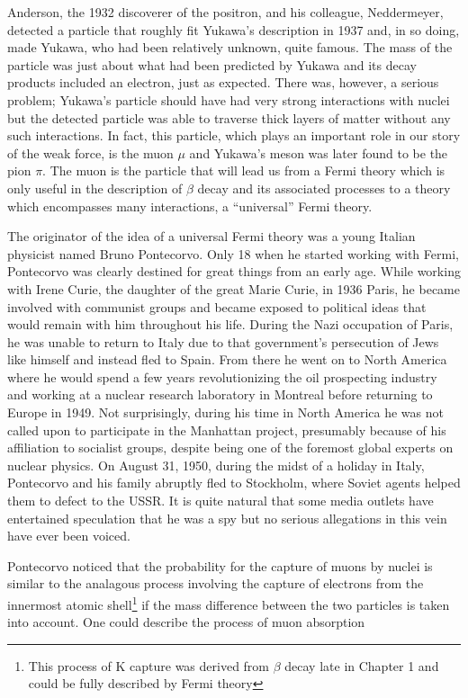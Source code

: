 \documentclass[a4paper,12pt]{book}
\begin{document}
Anderson, the 1932 discoverer of the positron, and his colleague, Neddermeyer, detected a particle that roughly fit Yukawa's description in 1937 \cite{anderson:muon} and, in so doing, made Yukawa, who had been relatively unknown, quite famous. The mass of the particle was just about what had been predicted by Yukawa and its decay products included an electron, just as expected. There was, however, a serious problem; Yukawa's particle should have had very strong interactions with nuclei but the detected particle was able to traverse thick layers of matter without any such interactions. In fact, this particle, which plays an important role in our story of the weak force, is the muon $\mu$ and Yukawa's meson was later found to be the pion $\pi$. The muon is the particle that will lead us from a Fermi theory which is only useful in the description of $\beta$ decay and its associated processes to a theory which encompasses many interactions, a ``universal'' Fermi theory. 

The originator of the idea of a universal Fermi theory was a young Italian physicist named Bruno Pontecorvo. Only 18 when he started working with Fermi, Pontecorvo was clearly destined for great things from an early age. While working with Irene Curie, the daughter of the great Marie Curie, in 1936 Paris, he became involved with communist groups and became exposed to political ideas that would remain with him throughout his life. During the Nazi occupation of Paris, he was unable to return to Italy due to that government's persecution of Jews like himself and instead fled to Spain. From there he went on to North America where he would spend a few years revolutionizing the oil prospecting industry and working at a nuclear research laboratory in Montreal before returning to Europe in 1949. Not surprisingly, during his time in North America he was not called upon to participate in the Manhattan project, presumably because of his affiliation to socialist groups, despite being one of the foremost global experts on nuclear physics. On August 31, 1950, during the midst of a holiday in Italy, Pontecorvo and his family abruptly fled to Stockholm, where Soviet agents helped them to defect to the USSR. It is quite natural that some media outlets have entertained speculation that he was a spy but no serious allegations in this vein have ever been voiced.

Pontecorvo noticed that the probability for the capture of muons by nuclei is similar to the analagous process involving the capture of electrons from the innermost atomic shell\footnote{This process of K capture was derived from $\beta$ decay late in Chapter 1 and could be fully described by Fermi theory} if the mass difference between the two particles is taken into account. One could describe the process of muon absorption
\end{document}
